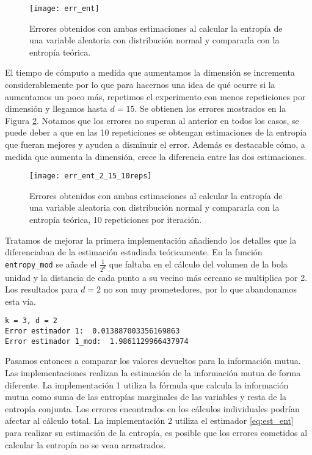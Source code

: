 \documentclass[12pt,a4paper]{report} %
\theoremstyle{definition}
\begin{document}
\begin{figure}[H]
    \centering
    \texttt{[image: err\_ent]}
    \caption{Errores obtenidos con ambas estimaciones al calcular la entropía de una variable aleatoria con distribución normal y compararla con la entropía teórica.}
    \label{fig:err_ent}
\end{figure}

El tiempo de cómputo a medida que aumentamos la dimensión se incrementa considerablemente por lo que para hacernos una idea de qué ocurre si la aumentamos un poco más, repetimos el experimento con menos repeticiones por dimensión y llegamos hasta $d = 15$. Se obtienen los errores mostrados en la Figura \ref{fig:err_ent15}. Notamos que los errores no superan al anterior en todos los casos, se puede deber a que en las 10 repeticiones se obtengan estimaciones de la entropía que fueran mejores y ayuden a disminuir el error. Además es destacable cómo, a medida que aumenta la dimensión, crece la diferencia entre las dos estimaciones.

\begin{figure}[H]
    \centering
    \texttt{[image: err\_ent\_2\_15\_10reps]}
    \caption{Errores obtenidos con ambas estimaciones al calcular la entropía de una variable aleatoria con distribución normal y compararla con la entropía teórica, 10 repeticiones por iteración.}
    \label{fig:err_ent15}
\end{figure}


Tratamos de mejorar la primera implementación añadiendo los detalles que la diferenciaban de la estimación estudiada teóricamente. En la función \texttt{entropy\_mod} se añade el $\frac{1}{2^d}$ que faltaba en el cálculo del volumen de la bola unidad y la distancia de cada punto a su vecino más cercano se multiplica por 2. Los resultados para $d = 2$ no son muy prometedores, por lo que abandonamos esta vía.

\begin{lstlisting}
k = 3, d = 2
Error estimador 1:  0.013887003356169863
Error estimador 1_mod:  1.9861129966437974
\end{lstlisting}


Pasamos entonces a comparar los valores devueltos para la información mutua. Las implementaciones realizan la estimación de la información mutua de forma diferente. La implementación 1 utiliza la fórmula que calcula la información mutua como suma de las entropías marginales de las variables y resta de la entropía conjunta. Los errores encontrados en los cálculos individuales podrían afectar al cálculo total. La implementación 2 utiliza el estimador \ref{eq:est_ent} para realizar su estimación de la entropía, es posible que los errores cometidos al calcular la entropía no se vean arrastrados.
\end{document}
